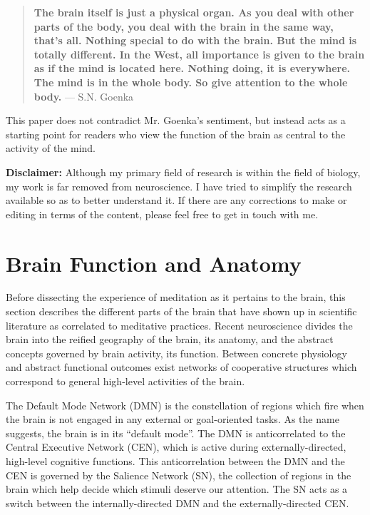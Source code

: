 \documentclass[a4paper, amsfonts, amssymb, amsmath, reprint, showkeys, nofootinbib, twoside]{revtex4-1}
\begin{document}
\begin{quote}
  \textbf{The brain itself is just a physical organ. As you deal with other parts of
    the body, you deal with the brain in the same way, that's all. Nothing special to
    do with the brain. But the mind is totally different. In the West, all importance
    is given to the brain as if the mind is located here. Nothing doing, it is
    everywhere. The mind is in the whole body. So give attention to the whole
    body.} --- S.N. Goenka \cite{goenkabrain}
\end{quote}

This paper does not contradict Mr. Goenka's sentiment, but instead acts as a starting
point for readers who view the function of the brain as central to the activity of
the mind.

\textbf{Disclaimer:} Although my primary field of research is within the field of
biology, my work is far removed from neuroscience. I have tried to simplify the research available so as to better
understand it. If there are any corrections to make or editing in terms of the
content, please feel free to get in touch with me.


\section{Brain Function and Anatomy}

Before dissecting the experience of meditation as it pertains to the brain, this
section describes the different parts of the brain that have shown up in
scientific literature as correlated to meditative practices. Recent neuroscience divides the
brain into the reified geography of the brain, its anatomy, and the abstract concepts
governed by brain activity, its function. Between concrete physiology and abstract
functional outcomes exist networks of cooperative structures which correspond to general
high-level activities of the brain.

The Default Mode Network (DMN) is the constellation of regions which fire when
the brain is not engaged in any external or goal-oriented
tasks. As the name suggests, the brain is in its ``default
mode''. \cite{defaultnetworkadaptive} The DMN is anticorrelated to the Central Executive
Network (CEN), which is active during externally-directed, high-level cognitive
functions. \cite{saliencenetwork} This anticorrelation between the DMN and the CEN is
governed by the Salience Network (SN), the collection of regions in the brain which
help decide which stimuli deserve our attention. The SN acts as a switch between the
internally-directed DMN and the externally-directed CEN. \cite{saliencenetwork}
\end{document}

